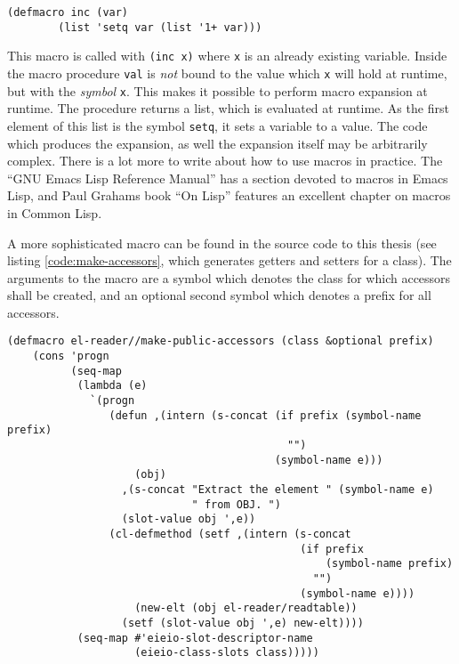 \documentclass[a4paper,10pt,twoside]{article}
\newcommand{\el}{Emacs Lisp}
\newcommand{\cl}{Common Lisp}
\newcommand{\sym}[1]{\texttt{#1}}
\begin{document}
\begin{lstlisting}[style=lispcode,caption={Increment as a
      macro.},label={code:increment}]
  (defmacro inc (var)
        (list 'setq var (list '1+ var)))
\end{lstlisting}

This macro is called with \texttt{(inc x)} where \sym{x} is an already existing
variable.  Inside the macro procedure \sym{val} is \emph{not} bound to the value
which \sym{x} will hold at runtime, but with the \emph{symbol} \sym{x}.  This
makes it possible to perform macro expansion at runtime.  The procedure returns
a list, which is evaluated at runtime.  As the first element of this list is the
symbol \sym{setq}, it sets a variable to a value.  The code which produces the
expansion, as well the expansion itself may be arbitrarily complex.  There is a
lot more to write about how to use macros in practice.  The ``GNU Emacs Lisp
Reference Manual'' has a section devoted to macros in \el, and Paul Grahams book
``On Lisp'' \cite{on-lisp} features an excellent chapter on macros in \cl{}.

A more sophisticated macro can be found in the source code to this thesis (see
listing \ref{code:make-accessors}, which generates getters and setters for a
class).  The arguments to the macro are a symbol which denotes the class for
which accessors shall be created, and an optional second symbol which denotes a
prefix for all accessors.

\begin{lstlisting}[style=lispcode,caption={Create accessors for all data members
  of a given class.},label={code:make-accessors}]
(defmacro el-reader//make-public-accessors (class &optional prefix)
    (cons 'progn
          (seq-map
           (lambda (e)
             `(progn
                (defun ,(intern (s-concat (if prefix (symbol-name prefix)
                                            "")
                                          (symbol-name e)))
                    (obj)
                  ,(s-concat "Extract the element " (symbol-name e)
                             " from OBJ. ")
                  (slot-value obj ',e))
                (cl-defmethod (setf ,(intern (s-concat
                                              (if prefix
                                                  (symbol-name prefix)
                                                "")
                                              (symbol-name e))))
                    (new-elt (obj el-reader/readtable))
                  (setf (slot-value obj ',e) new-elt))))
           (seq-map #'eieio-slot-descriptor-name
                    (eieio-class-slots class)))))
\end{lstlisting}
\end{document}
